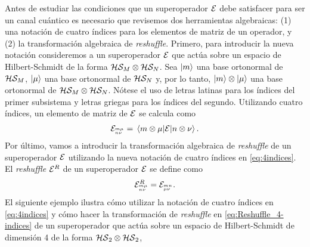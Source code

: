 Antes de estudiar las condiciones que un superoperador $\mathcal{E}$
debe satisfacer para ser un canal cuántico es necesario que revisemos
dos herramientas algebraicas: (1) una notación de cuatro índices 
para los elementos de matriz de un operador, y (2) la transformación 
algebraica de \textit{reshuffle}. Primero, para introducir la nueva notación
consideremos a un superoperador $\mathcal{E}$ que actúa sobre un espacio de 
Hilbert-Schmidt de la forma $\mathcal{H}\mathcal{S}_M\otimes\mathcal{H}\mathcal{S}_N$. 
Sea $\ket{m}$ una base ortonormal de $\mathcal{H}\mathcal{S}_M$, $\ket{\mu}$ 
una base ortonormal de $\mathcal{H}\mathcal{S}_N$ y, por lo tanto, 
$\ket{m}\otimes\ket{\mu}$ una base ortonormal de 
$\mathcal{H}\mathcal{S}_M\otimes\mathcal{H}\mathcal{S}_N$.
Nótese el uso de letras latinas para los índices del
primer subsistema y letras griegas para los índices del segundo. 
Utilizando cuatro índices, un elemento de matriz de $\mathcal{E}$ se calcula como
\begin{align}
\E_\ind{m\mu}{n\nu}=\matrixel{m\otimes \mu}{\E}{n\otimes \nu}.
\label{eq:4indices}
\end{align}
Por último, vamos a introducir la transformación algebraica de \textit{reshuffle}
de un superoperador $\mathcal{E}$ utilizando la nueva notación de cuatro índices 
en \eqref{eq:4indices}.
El \textit{reshuffle} $\mathcal{E}^R$ de un superoperador $\mathcal{E}$ se define 
como~\cite{bengtsson_zyczkowski_2017}
\begin{align}
\mathcal{E}^R_{{}^{m\mu}_{n\nu}} = \mathcal{E}_{{}^{mn}_{\mu\nu}}.
\label{eq:Reshuffle_4-indices}
\end{align}
El siguiente ejemplo ilustra cómo utilizar la notación de cuatro 
índices en \eqref{eq:4indices} y cómo hacer la transformación 
de \textit{reshuffle} en \eqref{eq:Reshuffle_4-indices} de un 
superoperador que actúa sobre un espacio de Hilbert-Schmidt de 
dimensión 4 de la forma $\mathcal{HS}_2\otimes \mathcal{HS}_2$,
